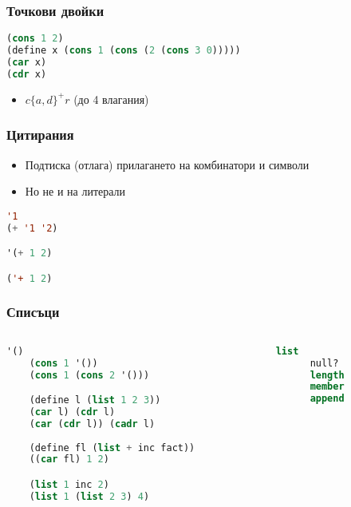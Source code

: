\documentclass{beamer}
\begin{document}
\begin{frame}[fragile]
\frametitle{Точкови двойки}

\begin{lstlisting}[language=Lisp]
(cons 1 2)
(define x (cons 1 (cons (2 (cons 3 0)))))
(car x)
(cdr x)
\end{lstlisting}
\begin{itemize}
  \item $c\{a,d\}^+r$ (до 4 влагания)
\end{itemize}

\end{frame}

\begin{frame}[fragile]
\frametitle{Цитирания}

\begin{itemize}
  \item Подтиска (отлага) прилагането на комбинатори и символи
  \item Но не и на литерали
\end{itemize}

\begin{lstlisting}[language=Lisp]
'1
(+ '1 '2)

'(+ 1 2)

('+ 1 2)
\end{lstlisting}

\end{frame}



\begin{frame}[fragile]
\frametitle{Списъци}

\begin{columns}[t]
  \begin{column}{0.7\textwidth}
    \begin{lstlisting}[language=Lisp]
    '()
    (cons 1 '())
    (cons 1 (cons 2 '()))

    (define l (list 1 2 3))
    (car l) (cdr l)
    (car (cdr l)) (cadr l)
  
    (define fl (list + inc fact))
    ((car fl) 1 2)

    (list 1 inc 2)
    (list 1 (list 2 3) 4)
  \end{lstlisting}

  \end{column}
  \begin{column}{0.3\textwidth}
    \begin{lstlisting}[language=Lisp]
      list
      null?
      length
      member
      append
    \end{lstlisting}
  \end{column} 
\end{columns}

\end{frame}
\end{document}
